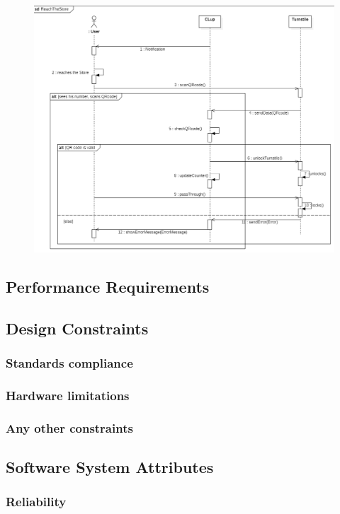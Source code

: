 \documentclass{article}
\begin{document}
\begin{figure}[H]
  \includegraphics[width=\linewidth]{ReachStoreSequence.png}
  
\end{figure}




\subsection{Performance Requirements}

\subsection{Design Constraints}
\subsubsection{Standards compliance}
\subsubsection{Hardware limitations}
\subsubsection{Any other constraints}

\subsection{Software System Attributes}
\subsubsection{Reliability}
\end{document}
